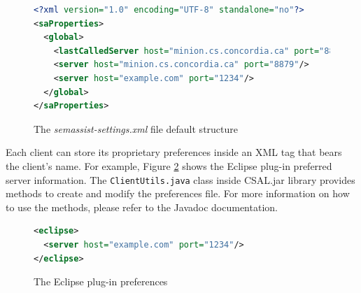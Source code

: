 \begin{figure}[!tb]
\begin{lstlisting}[language=XML,xleftmargin=4mm,columns=flexible]
<?xml version="1.0" encoding="UTF-8" standalone="no"?>
<saProperties>
  <global>
    <lastCalledServer host="minion.cs.concordia.ca" port="8879"/>
    <server host="minion.cs.concordia.ca" port="8879"/>
    <server host="example.com" port="1234"/>
  </global>
</saProperties>
\end{lstlisting}
\caption{The \emph{semassist-settings.xml} file default structure}
\label{list:semassist-settings}
\end{figure}

Each client can store its proprietary preferences inside an XML tag that bears the client's name. For example, Figure \ref{list:eclipse-pref} shows the Eclipse plug-in preferred server information. The \texttt{ClientUtils.java} class inside CSAL.jar library provides methods to create and modify the preferences file. For more information on how to use the methods, please refer to the Javadoc documentation.

\begin{figure}[!tb]
\begin{lstlisting}[language=XML,xleftmargin=4mm,columns=flexible]
<eclipse>
  <server host="example.com" port="1234"/>
</eclipse>
\end{lstlisting}
\caption{The Eclipse plug-in preferences}
\label{list:eclipse-pref}
\end{figure}